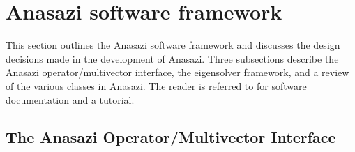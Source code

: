 \documentclass[acmtoms]{acmtrans2m}
\begin{document}



\section{Anasazi software framework}
\label{sec:framework}

This section outlines the Anasazi software framework and discusses 
the design decisions made in the development of Anasazi. Three
subsections describe the Anasazi operator/multivector interface, the
eigensolver framework, and a review of the various classes in
Anasazi. The reader is referred to
\cite{Trilinos:anasazi,Trilinos-Tutorial} for software documentation
and a tutorial.

\subsection{The Anasazi Operator/Multivector Interface}
\label{sec:anasazi:opvec}
\end{document}
